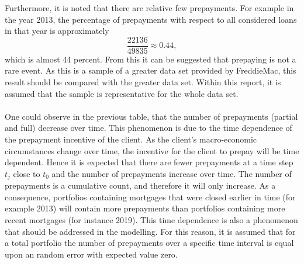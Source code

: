         Furthermore, it is noted that there are relative few 
        prepayments. For example in the year 2013, the percentage 
        of prepayments with respect to all considered loans in that year
        is approximately
        \begin{equation}
            \dfrac{
                22136  
            }{
                49835
            } \approx 0.44,
        \end{equation}
        which is almost 44 percent. From this it can be suggested that 
        prepaying is not a rare event. As this is a sample of a greater 
        data set provided by FreddieMac, this result should be compared 
        with the greater data set. Within this report, it is assumed that
        the sample is representative for the whole data set.  
        \\\\ 
        One could observe in the previous table, that the number of 
        prepayments (partial and full) decrease over time. This 
        phenomenon is due to the time dependence of the prepayment 
        incentive of the client. As the client's macro-economic circumstances change over time, the incentive for 
        the client to prepay will be time dependent. Hence it is 
        expected that there are fewer prepayments at a time step $t_j$ 
        close to $t_0$ and the number of prepayments increase over 
        time. The number of prepayments is a cumulative count, and therefore it 
        will only increase. As a consequence, portfolios containing 
        mortgages that were closed earlier in time (for example 2013)
        will contain more prepayments than portfolios containing more 
        recent mortgages (for instance 2019). This time dependence is 
        also a phenomenon that should be addressed in the modelling.
        For this reason, it is assumed that for a total portfolio 
        the number of prepayments over a specific time interval is 
        equal upon an random error with expected value zero.
        


